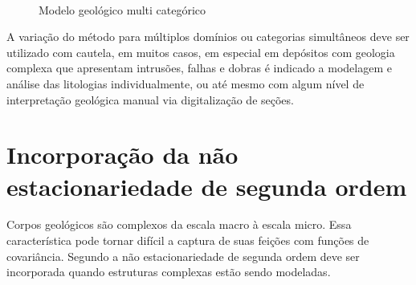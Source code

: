 \begin{figure}[t]
\caption{Modelo geológico multi categórico} 
\label{multi_cat_rbf}
\begin{center}
\\
\end{center}
\begin{center}
\end{center}
\end{figure}

A variação do método para múltiplos domínios ou categorias simultâneos deve ser utilizado com cautela, em muitos casos, em especial em depósitos com geologia complexa que apresentam intrusões, falhas e dobras é indicado a modelagem e análise das litologias individualmente, ou até mesmo com algum nível de interpretação geológica manual via digitalização de seções.

\section{Incorporação da não estacionariedade de segunda ordem}

Corpos geológicos são complexos da escala macro à escala micro. Essa característica pode tornar difícil a captura de suas feições com funções de covariância. Segundo  a não estacionariedade de segunda ordem deve ser incorporada quando estruturas complexas estão sendo modeladas.

